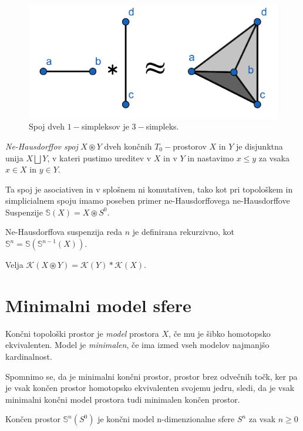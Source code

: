 \documentclass[mat1]{fmfdelo}
\DeclareRobustCommand{\k}{
    \mathcal{K}
}
\begin{document}
\begin{figure}[h]
    \centering
    \includegraphics[width=0.6\linewidth]{spoj.png}
    \caption{Spoj dveh $1-$simpleksov je $3-$simpleks.}
\end{figure}

\begin{definicija}
    \textit{Ne-Hausdorffov spoj} $X\circledast Y$ dveh končnih $T_0-$prostorov
     $X$ in $Y$ je disjunktna unija $X\bigsqcup Y$, v kateri
     pustimo ureditev v $X$ in v $Y$ in nastavimo $x\leq y$ za vsaka 
     $x\in X$ in $y\in Y$.
\end{definicija}
Ta spoj je asociativen in v splošnem ni komutativen, tako kot pri topološkem
 in simplicialnem spoju imamo poseben primer ne-Hausdorffovega ne-Hausdorffove Suspenzije
  $\mathds{S}(X)=X \circledast S^0$.

  Ne-Hausdorffova suspenzija reda $n$ je definirana rekurzivno, kot  $\mathds{S}^n=\mathds{S}(\mathds{S}^{n-1}(X))$.
  \begin{opomba}
    \label{op:spoj}
    Velja $\k(X\circledast Y) = \k(Y)\ast \k(X)$.
  \end{opomba}
\section{Minimalni model sfere}


\begin{definicija}
    Končni topološki prostor je \textit{model} prostora $X$, če mu je šibko homotopsko ekvivalenten. Model je \textit{minimalen}, če ima izmed vseh modelov najmanjšo kardinalnost.
\end{definicija}

Spomnimo se, da je minimalni končni prostor, prostor brez odvečnih točk, ker pa je vsak končen prostor homotopsko ekvivalenten svojemu jedru, sledi, da je vsak minimalni končni model prostora tudi minimalen končen prostor.

\begin{trditev}
    Končen prostor $\mathds{S}^n(S^0)$ je končni model n-dimenzionalne sfere $S^n$ za vsak $n\geq 0$
\end{trditev}
\end{document}
